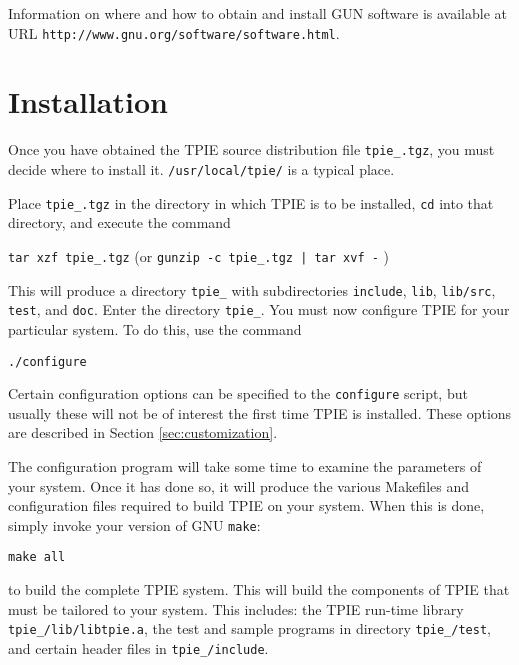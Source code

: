 Information on where and how to obtain and install GUN software is
available at URL {\tt http://www.gnu.org/software/software.html}.


\section{Installation}\label{sec:installation}

Once you have obtained the TPIE source distribution file
{\tt tpie\_\version.tgz}, you must decide where to install it.
\verb|/usr/local/tpie/| is a typical place.

Place {\tt tpie\_\version.tgz} in the directory in which TPIE is to
be installed, \verb|cd| into that directory, and execute the command

\begin{flushleft}
{\tt tar xzf tpie\_\version.tgz}
(or {\tt gunzip -c tpie\_\version.tgz | tar xvf -} )  
\end{flushleft}

This will produce a directory {\tt tpie\_\version} with
subdirectories \verb|include|, \verb|lib|, \verb|lib/src|,
\verb|test|, and \verb|doc|.  Enter the directory 
{\tt tpie\_\version}.  You must now configure TPIE for your
particular system.  To do this, use the command

\begin{verbatim}
./configure
\end{verbatim}

 Certain configuration options can be
specified to the {\tt configure} script, but usually these
will not be of interest the first time TPIE is installed.
These options are described in Section \ref{sec:customization}.

The configuration program will take some time to
examine the parameters of your system.  Once it has done so, it will
produce the various Makefiles and configuration files required to
build TPIE on your system.  When this is done, simply invoke your version
of GNU \verb|make|:

\begin{verbatim}
make all
\end{verbatim}

to build the complete TPIE system.  This will build the
components of TPIE that must be tailored to your
system. This includes: the TPIE run-time library 
{\tt tpie\_\version/lib/libtpie.a}, the test and sample
programs in directory {\tt tpie\_\version/test}, 
and certain header files in {\tt tpie\_\version/include}.

